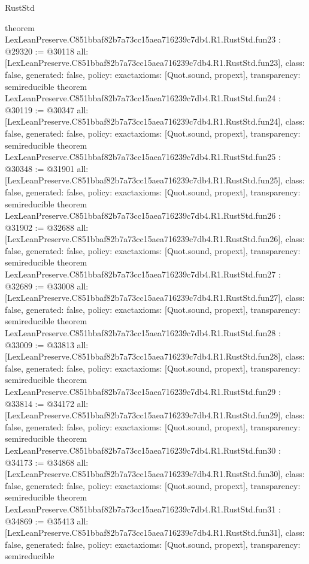 \begin{lexlean}{RustStd}
\begin{coremodule}
{}
theorem LexLeanPreserve.C851bbaf82b7a73cc15aea716239c7db4.R1.RustStd.fun23 : @29320 := @30118 {
  all: [LexLeanPreserve.C851bbaf82b7a73cc15aea716239c7db4.R1.RustStd.fun23],
  class: false,
  generated: false,
  policy: exact{axioms: [Quot.sound, propext]},
  transparency: semireducible
}
theorem LexLeanPreserve.C851bbaf82b7a73cc15aea716239c7db4.R1.RustStd.fun24 : @30119 := @30347 {
  all: [LexLeanPreserve.C851bbaf82b7a73cc15aea716239c7db4.R1.RustStd.fun24],
  class: false,
  generated: false,
  policy: exact{axioms: [Quot.sound, propext]},
  transparency: semireducible
}
theorem LexLeanPreserve.C851bbaf82b7a73cc15aea716239c7db4.R1.RustStd.fun25 : @30348 := @31901 {
  all: [LexLeanPreserve.C851bbaf82b7a73cc15aea716239c7db4.R1.RustStd.fun25],
  class: false,
  generated: false,
  policy: exact{axioms: [Quot.sound, propext]},
  transparency: semireducible
}
theorem LexLeanPreserve.C851bbaf82b7a73cc15aea716239c7db4.R1.RustStd.fun26 : @31902 := @32688 {
  all: [LexLeanPreserve.C851bbaf82b7a73cc15aea716239c7db4.R1.RustStd.fun26],
  class: false,
  generated: false,
  policy: exact{axioms: [Quot.sound, propext]},
  transparency: semireducible
}
theorem LexLeanPreserve.C851bbaf82b7a73cc15aea716239c7db4.R1.RustStd.fun27 : @32689 := @33008 {
  all: [LexLeanPreserve.C851bbaf82b7a73cc15aea716239c7db4.R1.RustStd.fun27],
  class: false,
  generated: false,
  policy: exact{axioms: [Quot.sound, propext]},
  transparency: semireducible
}
theorem LexLeanPreserve.C851bbaf82b7a73cc15aea716239c7db4.R1.RustStd.fun28 : @33009 := @33813 {
  all: [LexLeanPreserve.C851bbaf82b7a73cc15aea716239c7db4.R1.RustStd.fun28],
  class: false,
  generated: false,
  policy: exact{axioms: [Quot.sound, propext]},
  transparency: semireducible
}
theorem LexLeanPreserve.C851bbaf82b7a73cc15aea716239c7db4.R1.RustStd.fun29 : @33814 := @34172 {
  all: [LexLeanPreserve.C851bbaf82b7a73cc15aea716239c7db4.R1.RustStd.fun29],
  class: false,
  generated: false,
  policy: exact{axioms: [Quot.sound, propext]},
  transparency: semireducible
}
theorem LexLeanPreserve.C851bbaf82b7a73cc15aea716239c7db4.R1.RustStd.fun30 : @34173 := @34868 {
  all: [LexLeanPreserve.C851bbaf82b7a73cc15aea716239c7db4.R1.RustStd.fun30],
  class: false,
  generated: false,
  policy: exact{axioms: [Quot.sound, propext]},
  transparency: semireducible
}
theorem LexLeanPreserve.C851bbaf82b7a73cc15aea716239c7db4.R1.RustStd.fun31 : @34869 := @35413 {
  all: [LexLeanPreserve.C851bbaf82b7a73cc15aea716239c7db4.R1.RustStd.fun31],
  class: false,
  generated: false,
  policy: exact{axioms: [Quot.sound, propext]},
  transparency: semireducible
}
\end{coremodule}
\end{lexlean}
